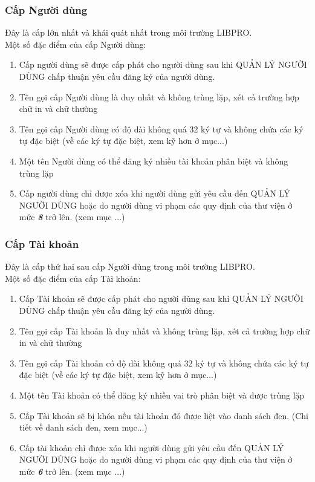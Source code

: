 \documentclass[12pt,a4paper]{report}
\begin{document}
			\subsubsection{Cấp Người dùng}
			Đây là cấp lớn nhất và khái quát nhất trong môi trường LIBPRO.\\
			Một số đặc điểm của cấp Người dùng:
			\begin{enumerate}
				\item Cấp người dùng sẽ được cấp phát cho người dùng sau khi QUẢN LÝ NGƯỜI DÙNG chấp thuận yêu cầu đăng ký của người dùng.
				\item Tên gọi cấp Người dùng là duy nhất và không trùng lặp, xét cả trường hợp chữ in và chữ thường
				\item Tên gọi cấp Người dùng có độ dài không quá 32 ký tự và không chứa các ký tự đặc biệt (về các ký tự đặc biệt, xem kỹ hơn ở mục...)
				\item Một tên Người dùng có thể đăng ký nhiều tài khoản phân biệt và không trùng lặp
				\item Cấp người dùng chỉ được xóa khi người dùng gửi yêu cầu đến QUẢN LÝ NGƯỜI DÙNG hoặc do người dùng vi phạm các quy định của thư viện ở mức \textbf{\textit{8}} trở lên. (xem mục ...)
			\end{enumerate}

			\subsubsection{Cấp Tài khoản}
			Đây là cấp thứ hai sau cấp Người dùng trong môi trường LIBPRO.\\
			Một số đặc điểm của cấp Tài khoản:
			\begin{enumerate}
				\item Cấp Tài khoản sẽ được cấp phát cho người dùng sau khi QUẢN LÝ NGƯỜI DÙNG chấp thuận yêu cầu đăng ký của người dùng.
				\item Tên gọi cấp Tài khoản là duy nhất và không trùng lặp, xét cả trường hợp chữ in và chữ thường
				\item Tên gọi cấp Tài khoản có độ dài không quá 32 ký tự và không chứa các ký tự đặc biệt (về các ký tự đặc biệt, xem kỹ hơn ở mục...)
				\item Một tên Tài khoản có thể đăng ký nhiều vai trò phân biệt và được trùng lặp
				\item Cấp Tài khoản sẽ bị khóa nếu tài khoản đó được liệt vào danh sách đen. (Chi tiết về danh sách đen, xem mục...)
				\item Cấp tài khoản chỉ được xóa khi người dùng gửi yêu cầu đến QUẢN LÝ NGƯỜI DÙNG hoặc do người dùng vi phạm các quy định của thư viện ở mức \textbf{\textit{6}} trở lên. (xem mục ...)
			\end{enumerate}
\end{document}
